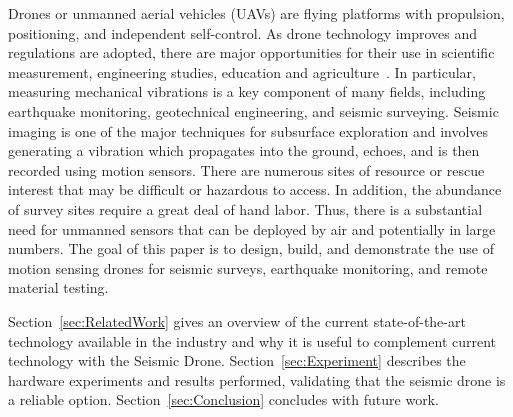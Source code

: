 Drones or unmanned aerial vehicles (UAVs) are flying
platforms with propulsion, positioning, and independent self-control.
As drone technology improves and regulations are
adopted, there are major opportunities for their use in scientific measurement, engineering studies, education and agriculture~\cite{tripicchio2015towards}. In particular,
measuring mechanical vibrations is a key component of many
fields, including earthquake monitoring, geotechnical engineering,
and seismic surveying. Seismic imaging is one of the
major techniques for subsurface exploration
and involves generating a vibration which propagates
into the ground, echoes, and is then recorded using motion
sensors. There are numerous sites of resource or rescue interest
that may be difficult or hazardous to access. In addition, the abundance of survey sites require a great deal
of hand labor. Thus, there is a substantial need for unmanned
sensors that can be deployed by air and potentially in large
numbers. 
The goal of this paper is to design, build, and demonstrate
the use of motion sensing drones for seismic surveys, earthquake monitoring, and remote material testing. 

Section~\ref{sec:RelatedWork}  gives an overview of  the current state-of-the-art technology available in the industry and why it is useful to complement current technology  with the Seismic Drone.
Section~\ref{sec:Experiment} describes the hardware experiments and results performed, validating that the seismic drone is a reliable option. Section~\ref{sec:Conclusion} concludes with future work.

